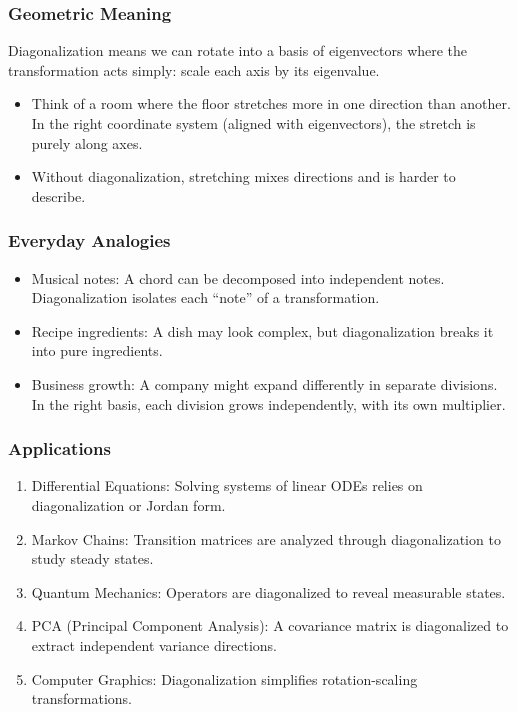 \documentclass[
  letterpaper,
  DIV=11,
  numbers=noendperiod]{scrreprt}
\providecommand{\tightlist}{%
  \setlength{\itemsep}{0pt}\setlength{\parskip}{0pt}}
\begin{document}
\subsubsection{Geometric Meaning}\label{geometric-meaning-12}

Diagonalization means we can rotate into a basis of eigenvectors where
the transformation acts simply: scale each axis by its eigenvalue.

\begin{itemize}
\tightlist
\item
  Think of a room where the floor stretches more in one direction than
  another. In the right coordinate system (aligned with eigenvectors),
  the stretch is purely along axes.
\item
  Without diagonalization, stretching mixes directions and is harder to
  describe.
\end{itemize}

\subsubsection{Everyday Analogies}\label{everyday-analogies-60}

\begin{itemize}
\tightlist
\item
  Musical notes: A chord can be decomposed into independent notes.
  Diagonalization isolates each ``note'' of a transformation.
\item
  Recipe ingredients: A dish may look complex, but diagonalization
  breaks it into pure ingredients.
\item
  Business growth: A company might expand differently in separate
  divisions. In the right basis, each division grows independently, with
  its own multiplier.
\end{itemize}

\subsubsection{Applications}\label{applications-26}

\begin{enumerate}
\def\labelenumi{\arabic{enumi}.}
\tightlist
\item
  Differential Equations: Solving systems of linear ODEs relies on
  diagonalization or Jordan form.
\item
  Markov Chains: Transition matrices are analyzed through
  diagonalization to study steady states.
\item
  Quantum Mechanics: Operators are diagonalized to reveal measurable
  states.
\item
  PCA (Principal Component Analysis): A covariance matrix is
  diagonalized to extract independent variance directions.
\item
  Computer Graphics: Diagonalization simplifies rotation-scaling
  transformations.
\end{enumerate}
\end{document}
